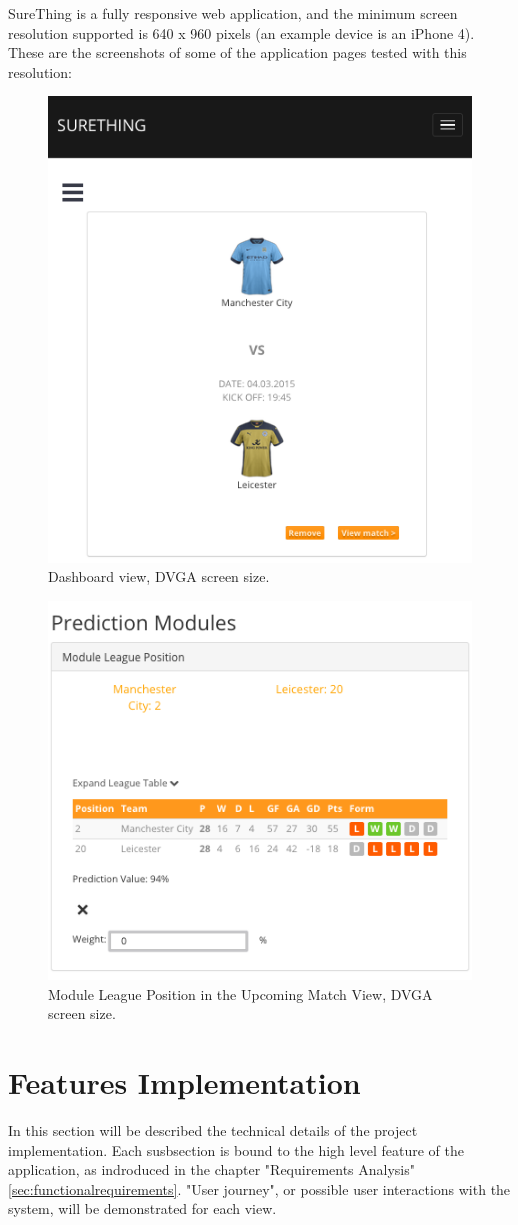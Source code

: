 SureThing is a fully responsive web application, and the minimum screen resolution supported is 640 x 960 pixels (an example device is an iPhone 4). These are the screenshots of some of the application pages tested with this resolution:

\begin{figure}[H]
	\begin{center}
		\includegraphics[width=.50\textwidth]{impl/images/responsiveDashboard}
		\caption{Dashboard view, DVGA screen size.} \label{fig:using:responsivedashboard}
	\end{center}
\end{figure}

\begin{figure}[H]
	\begin{center}
		\includegraphics[width=.50\textwidth]{impl/images/responsiveModuleLeaguePosition}
		\caption{Module League Position in the Upcoming Match View, DVGA screen size.} \label{fig:using:responsivemoduleleagueposition}
	\end{center}
\end{figure}

\section{Features Implementation}
In this section will be described the technical details of the project implementation. Each susbsection is bound to the high level feature of the application, as indroduced in the chapter "Requirements Analysis" \ref{sec:functionalrequirements}. "User journey", or possible user interactions with the system, will be demonstrated for each view.

